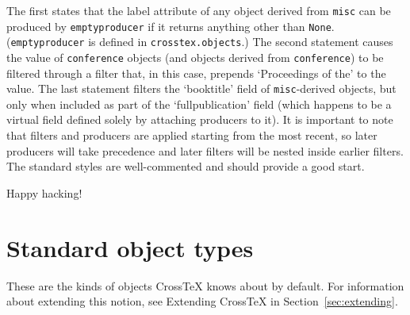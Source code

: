 \documentclass{article}
\newcommand{\XTX}{Cross\TeX}
\begin{document}
The first states that the label attribute of any object derived from
\texttt{misc} can be produced by \texttt{emptyproducer} if it returns
anything other than \texttt{None}.  (\texttt{emptyproducer} is defined
in \texttt{crosstex.objects}.)  The second statement causes the value of
\texttt{conference} objects (and objects derived from \texttt{conference})
to be filtered through a filter that, in this case, prepends `Proceedings
of the' to the value.  The last statement filters the `booktitle' field
of \texttt{misc}-derived objects, but only when included as part of the
`fullpublication' field (which happens to be a virtual field defined
solely by attaching producers to it).  It is important to note that
filters and producers are applied starting from the most recent, so
later producers will take precedence and later filters will be nested
inside earlier filters.  The standard styles are well-commented and
should provide a good start.

Happy hacking!


\appendix
\section{Standard object types\label{sec:standard}}

These are the kinds of objects \XTX{} knows about by default. For
information about extending this notion, see Extending \XTX{} in
Section~\ref{sec:extending}.
\end{document}
